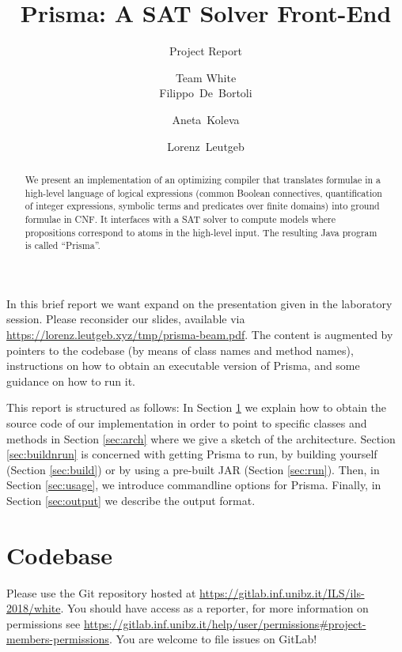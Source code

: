 \documentclass{llncs}
\title{Prisma: A SAT Solver Front-End}
\subtitle{Project Report}
\author{Team White\\[2mm]Filippo~De~Bortoli \and Aneta~Koleva \and Lorenz~Leutgeb}
\institute{Free University of Bozen-Bolzano\\[3mm] \texttt{\{\href{mailto:filippo.debortoli@stud-inf.unibz.it}{filippo.debortoli},\href{mailto:aneta.koleva@stud-inf.unibz.it}{aneta.koleva},\href{mailto:lorenz.leutgeb@stud-inf.unibz.it}{lorenz.leutgeb}\}\newline @stud-inf.unibz.it}}
\begin{document}
  \maketitle

  \begin{abstract}
We present an implementation of an optimizing compiler that translates formulae in a high-level language of logical expressions (common Boolean connectives, quantification of integer expressions, symbolic terms and predicates over finite domains) into ground formulae in CNF. It interfaces with a SAT solver to compute models where propositions correspond to atoms in the high-level input. The resulting Java program is called \enquote{Prisma}.
  \end{abstract}

%
%
%
%
%

In this brief report we want expand on the presentation given in the laboratory session. Please reconsider our slides, available via \url{https://lorenz.leutgeb.xyz/tmp/prisma-beam.pdf}. The content is augmented by pointers to the codebase (by means of class names and method names), instructions on how to obtain an executable version of Prisma, and some guidance on how to run it.

This report is structured as follows: In Section \ref{sec:code} we explain how to obtain the source code of our implementation in order to point to specific classes and methods in Section \ref{sec:arch} where we give a sketch of the architecture. Section \ref{sec:buildnrun} is concerned with getting Prisma to run, by building yourself (Section \ref{sec:build}) or by using a pre-built JAR (Section \ref{sec:run}). Then, in Section \ref{sec:usage}, we introduce commandline options for Prisma. Finally, in Section \ref{sec:output} we describe the output format.

\section{Codebase}
\label{sec:code}

Please use the Git repository hosted at \url{https://gitlab.inf.unibz.it/ILS/ils-2018/white}. You should have access as a reporter, for more information on permissions see \url{https://gitlab.inf.unibz.it/help/user/permissions#project-members-permissions}. You are welcome to file issues on GitLab!
\end{document}
